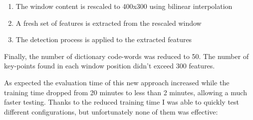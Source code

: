 \documentclass[]{report}
\begin{document}
\begin{enumerate}
	\item The window content is rescaled to 400x300 using bilinear interpolation
	\item A fresh set of features is extracted from the rescaled window
	\item The detection process is applied to the extracted features
\end{enumerate}

Finally, the number of dictionary code-words was reduced to 50.
The number of key-points found in each window position didn't exceed 300 features.

As expected the evaluation time of this new approach increased while the training time dropped from 20 minutes to less than 2 minutes, allowing a much faster testing. Thanks to the reduced training time I was able to quickly test different configurations, but unfortunately none of them was effective:

\vspace{0.5cm}
\end{document}
